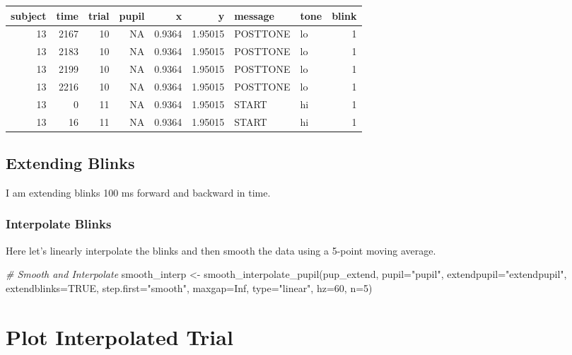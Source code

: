 \documentclass[
]{article}
\newenvironment{Shaded}{\begin{snugshade}}{\end{snugshade}}
\newcommand{\AttributeTok}[1]{\textcolor[rgb]{0.77,0.63,0.00}{#1}}
\newcommand{\CommentTok}[1]{\textcolor[rgb]{0.56,0.35,0.01}{\textit{#1}}}
\newcommand{\ConstantTok}[1]{\textcolor[rgb]{0.00,0.00,0.00}{#1}}
\newcommand{\DecValTok}[1]{\textcolor[rgb]{0.00,0.00,0.81}{#1}}
\newcommand{\FunctionTok}[1]{\textcolor[rgb]{0.00,0.00,0.00}{#1}}
\newcommand{\NormalTok}[1]{#1}
\newcommand{\OtherTok}[1]{\textcolor[rgb]{0.56,0.35,0.01}{#1}}
\newcommand{\StringTok}[1]{\textcolor[rgb]{0.31,0.60,0.02}{#1}}
\begin{document}
\begin{longtable}[]{@{}rrrrrrllr@{}}
\toprule
subject & time & trial & pupil & x & y & message & tone &
blink\tabularnewline
\midrule
\endhead
13 & 2167 & 10 & NA & 0.9364 & 1.95015 & POSTTONE & lo &
1\tabularnewline
13 & 2183 & 10 & NA & 0.9364 & 1.95015 & POSTTONE & lo &
1\tabularnewline
13 & 2199 & 10 & NA & 0.9364 & 1.95015 & POSTTONE & lo &
1\tabularnewline
13 & 2216 & 10 & NA & 0.9364 & 1.95015 & POSTTONE & lo &
1\tabularnewline
13 & 0 & 11 & NA & 0.9364 & 1.95015 & START & hi & 1\tabularnewline
13 & 16 & 11 & NA & 0.9364 & 1.95015 & START & hi & 1\tabularnewline
\bottomrule
\end{longtable}

\hypertarget{extending-blinks}{%
\subsection{Extending Blinks}\label{extending-blinks}}

I am extending blinks 100 ms forward and backward in time.

\hypertarget{interpolate-blinks}{%
\subsubsection{Interpolate Blinks}\label{interpolate-blinks}}

Here let's linearly interpolate the blinks and then smooth the data
using a 5-point moving average.

\begin{Shaded}
\begin{Highlighting}[]
\CommentTok{\# Smooth and Interpolate}
\NormalTok{smooth\_interp }\OtherTok{\textless{}{-}} \FunctionTok{smooth\_interpolate\_pupil}\NormalTok{(pup\_extend, }\AttributeTok{pupil=}\StringTok{"pupil"}\NormalTok{, }\AttributeTok{extendpupil=}\StringTok{"extendpupil"}\NormalTok{, }\AttributeTok{extendblinks=}\ConstantTok{TRUE}\NormalTok{, }\AttributeTok{step.first=}\StringTok{"smooth"}\NormalTok{, }\AttributeTok{maxgap=}\ConstantTok{Inf}\NormalTok{, }\AttributeTok{type=}\StringTok{"linear"}\NormalTok{, }\AttributeTok{hz=}\DecValTok{60}\NormalTok{, }\AttributeTok{n=}\DecValTok{5}\NormalTok{)}
\end{Highlighting}
\end{Shaded}

\hypertarget{plot-interpolated-trial}{%
\section{Plot Interpolated Trial}\label{plot-interpolated-trial}}
\end{document}
